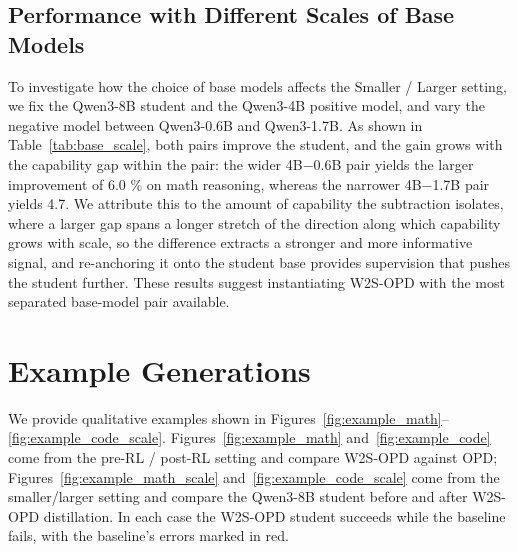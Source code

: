 \documentclass{article}
\newcommand\ours{W2S-OPD\xspace}
\begin{document}
\subsection{Performance with Different Scales of Base Models}
\label{sec:base_scale}
To investigate how the choice of base models affects the Smaller / Larger setting, we fix the Qwen3-8B student and the Qwen3-4B positive model, and vary the negative model between Qwen3-0.6B and Qwen3-1.7B. As shown in Table~\ref{tab:base_scale}, both pairs improve the student, and the gain grows with the capability gap within the pair: the wider 4B$-$0.6B pair yields the larger improvement of 6.0 \% on math reasoning, whereas the narrower 4B$-$1.7B pair yields 4.7. We attribute this to the amount of capability the subtraction isolates, where a larger gap spans a longer stretch of the direction along which capability grows with scale, so the difference extracts a stronger and more informative signal, and re-anchoring it onto the student base provides supervision that pushes the student further. These results suggest instantiating \ours with the most separated base-model pair available.

\section{Example Generations}
\label{app:examples}
We provide qualitative examples shown in Figures~\ref{fig:example_math}--\ref{fig:example_code_scale}. Figures~\ref{fig:example_math} and~\ref{fig:example_code} come from the pre-RL / post-RL setting and compare \ours against OPD; Figures~\ref{fig:example_math_scale} and~\ref{fig:example_code_scale} come from the smaller/larger setting and compare the Qwen3-8B student before and after \ours distillation. In each case the \ours student succeeds while the baseline fails, with the baseline's errors marked in red.

\end{document}
